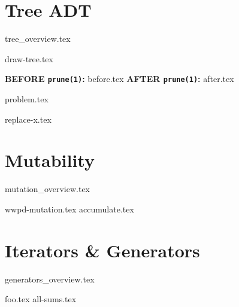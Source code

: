 \documentclass{exam}
\begin{document}
\section{Tree ADT}
{tree_overview.tex}
\newpage
\begin{questions}
    {draw-tree.tex}
    \newpage

    \begin{blocksection}
    \textbf{BEFORE \lstinline{prune(1)}:}
    {before.tex}
    \hspace{0.5in}
    \textbf{AFTER \lstinline{prune(1)}:}
    {after.tex}
    \end{blocksection}
    

    {problem.tex}

    {replace-x.tex}
\end{questions}

\newpage
\section{Mutability}
{mutation_overview.tex}
	\begin{questions}
	    {wwpd-mutation.tex}
        {accumulate.tex}
	\end{questions}


\newpage
\section{Iterators \& Generators}
{generators_overview.tex}
\begin{questions}
    {foo.tex}
    {all-sums.tex}
\end{questions}
\end{document}
